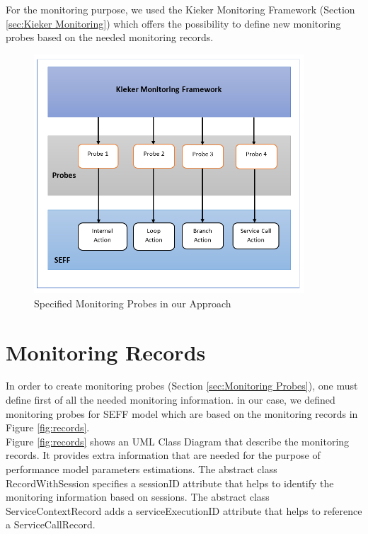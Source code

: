 For the monitoring purpose, we used the Kieker Monitoring Framework (Section \ref{sec:Kieker Monitoring}) which offers the possibility to define new monitoring probes based on the needed monitoring records.\\

\begin{figure}[h]
\centering
\includegraphics[width=0.9\textwidth]{figures/probes}
\caption{Specified Monitoring Probes in our Approach}
\label{fig:Specified Monitoring Probes in our Approach}
\end{figure}

\section{Monitoring Records}
\label{sec:Monitoring Records}
In order to create monitoring probes (Section \ref{sec:Monitoring Probes}), one must define first of all the needed monitoring information. in our case, we defined monitoring probes for SEFF model which are based on the monitoring records in Figure \ref{fig:records}. \\

Figure \ref{fig:records} shows an UML Class Diagram that describe the monitoring records. It provides extra information that are needed for the purpose of performance model parameters estimations. The abstract class RecordWithSession specifies a sessionID attribute that helps to identify the monitoring information based on sessions.  The abstract class ServiceContextRecord adds a serviceExecutionID attribute that helps to reference a ServiceCallRecord.\\

